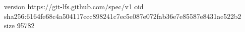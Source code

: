 version https://git-lfs.github.com/spec/v1
oid sha256:6164fe68c4a504117ccc898241c7ec5e087e072fab36e7e85587e8431ae522b2
size 95782
